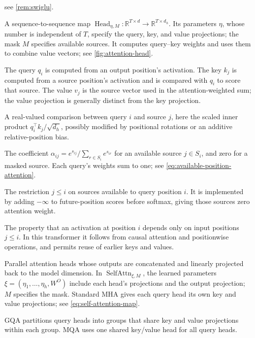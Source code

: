 \documentclass[11pt,twoside]{article}
\newcommand{\R}{\mathbb R}
\theoremstyle{plain}
\theoremstyle{definition}
\theoremstyle{remark}
\begin{document}
\begin{description}[style=nextline,leftmargin=1.5em,labelindent=0pt]
see \cref{rem:swiglu}.
\item[Attention head]
A sequence-to-sequence map
$\operatorname{Head}_{\eta,M}:\R^{T\times d}\to\R^{T\times d_h}$.
Its parameters $\eta$, whose number is independent of $T$, specify the query,
key, and value projections;
the mask $M$ specifies available sources. It computes query--key weights
and uses them to combine value vectors; see \cref{fig:attention-head}.
\item[Query; key; value]
The query $q_i$ is computed from an output position's activation. The key
$k_j$ is computed from a source position's activation and is compared with
$q_i$ to score that source. The value $v_j$ is the source vector used in
the attention-weighted sum; the value projection is generally distinct from
the key projection.
\item[Attention score]
A real-valued comparison between query $i$ and source $j$, here the scaled
inner product $q_i^\top k_j/\sqrt{d_h}$, possibly modified by positional
rotations or an additive relative-position bias.
\item[Attention weight]
The coefficient $\alpha_{ij}=e^{s_{ij}}/\sum_{r\in S_i}e^{s_{ir}}$ for
an available source $j\in S_i$, and zero for a masked source. Each query's
weights sum to one; see \cref{eq:available-position-attention}.
\item[Causal mask]
The restriction $j\le i$ on sources available to query position $i$.
It is implemented by adding $-\infty$ to future-position scores before
softmax, giving those sources zero attention weight.
\item[Causal dependence]
The property that an activation at position $i$ depends only on input
positions $j\le i$. In this transformer it follows from causal attention
and positionwise operations, and permits reuse of earlier keys and values.
\item[Multi-head attention (MHA)]
Parallel attention heads whose outputs are concatenated and linearly
projected back to the model dimension. In
$\operatorname{SelfAttn}_{\xi,M}$, the learned parameters
$\xi=(\eta_1,\ldots,\eta_h,W^O)$ include each head's projections and the
output projection; $M$ specifies the mask. Standard MHA gives each query
head its own key and value projections; see \cref{eq:self-attention-map}.
\item[Grouped-query attention (GQA); multi-query attention (MQA)]
GQA partitions query heads into groups that share key and value projections
within each group. MQA uses one shared key/value head for all query heads.

\end{description}
\end{document}

